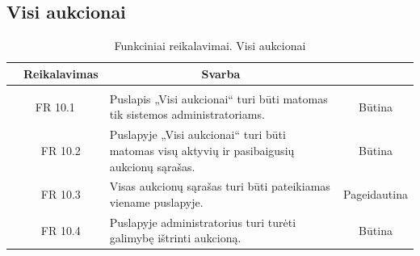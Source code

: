 \documentclass{VUMIFPSkursinis}
\begin{document}
	\subsection{Visi aukcionai}
	\begin{table}[H]
		\caption{Funkciniai reikalavimai. Visi aukcionai}
		\begin{tabular}{|p{1cm}|p{1cm}|p{}|p{}|}
			\hline 
			\rowcolor{gray!50}
			\multicolumn{2}{|c|}{{\bfseries Kodas}}&
			\multicolumn{1}{c|}{{\bfseries Reikalavimas}}&
			\multicolumn{1}{c|}{{\bfseries Svarba}}\\
			\hline
			\rowcolor{lightgray}
			\multicolumn{4}{|c|}{Visi aukcionai}\\				
			\hline
			\multicolumn{2}{|c|}{FR 10.1}&
			{Puslapis „Visi aukcionai“ turi būti matomas tik sistemos administratoriams.
			}&		
			\multicolumn{1}{c|}{Būtina}\\
			\hline
			\multicolumn{1}{|c}{}&
			\multicolumn{1}{c|}{FR 10.2}&
			{Puslapyje „Visi aukcionai“ turi būti matomas visų aktyvių ir pasibaigusių aukcionų sąrašas.
			}&		
			\multicolumn{1}{c|}{Būtina}\\
			\hline	
			\multicolumn{1}{|c}{}&
			\multicolumn{1}{c|}{FR 10.3}&
			{Visas aukcionų sąrašas turi būti pateikiamas viename puslapyje.
			}&
			\multicolumn{1}{c|}{Pageidautina}\\									
			\hline
			\multicolumn{1}{|c}{}&
			\multicolumn{1}{c|}{FR 10.4}&
			{Puslapyje administratorius turi turėti galimybę ištrinti aukcioną.
			}&
			\multicolumn{1}{c|}{Būtina}\\									
			\hline
		\end{tabular}		
	\end{table}
	
\end{document}
